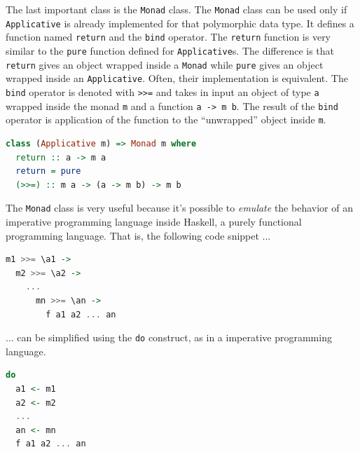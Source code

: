 \documentclass[12pt,a4paper]{article}
\begin{document}
The last important class is the \texttt{Monad} class.
The \texttt{Monad} class can be used only if \texttt{Applicative} is already implemented for that polymorphic data type.
It defines a function named \texttt{return} and the \texttt{bind} operator.
The \texttt{return} function is very similar to the \texttt{pure} function defined for \texttt{Applicative}s.
The difference is that \texttt{return} gives an object wrapped inside a \texttt{Monad} while \texttt{pure} gives an object wrapped inside an \texttt{Applicative}.
Often, their implementation is equivalent.
The \texttt{bind} operator is denoted with \texttt{>>=} and takes in input an object of type \texttt{a} wrapped inside the monad \texttt{m} and a function \texttt{a -> m b}.
The result of the \texttt{bind} operator is application of the function to the ``unwrapped'' object inside \texttt{m}.
\begin{lstlisting}[language=Haskell, style=custom-style]
class (Applicative m) => Monad m where
  return :: a -> m a
  return = pure
  (>>=) :: m a -> (a -> m b) -> m b
\end{lstlisting}
The \texttt{Monad} class is very useful because it's possible to \textit{emulate} the behavior of an imperative programming language inside Haskell, a purely functional programming language.
That is, the following code snippet ...
\begin{lstlisting}[language=Haskell, style=custom-style]
m1 >>= \a1 ->
  m2 >>= \a2 ->
    ...
      mn >>= \an ->
        f a1 a2 ... an
\end{lstlisting}
... can be simplified using the \texttt{do} construct, as in a imperative programming language.
\begin{lstlisting}[language=Haskell, style=custom-style]
do
  a1 <- m1
  a2 <- m2
  ...
  an <- mn
  f a1 a2 ... an
\end{lstlisting}
\end{document}

